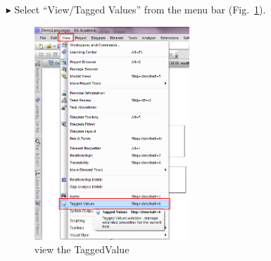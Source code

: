 \begin{enumerate}
\item[$\blacktriangleright$]Select ``View/Tagged Values'' from the menu bar (Fig.~\ref{fig_ignoreExportingProject01}).
\begin{figure}[htbp]
\begin{center}  \includegraphics[width=0.55\textwidth]{pics/tricks/ignoreExportingProject/ignoreExportingProject1}
  \caption{view the TaggedValue}  
  \label{fig_ignoreExportingProject01}
\end{center}
\end{figure} 


\end{enumerate}
